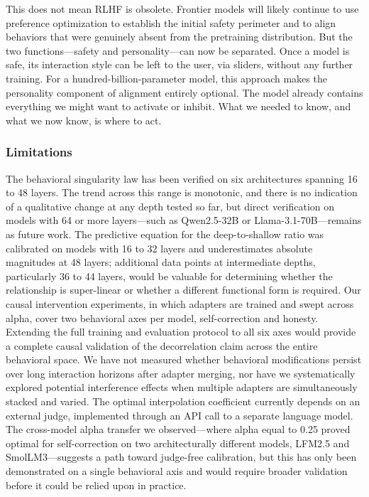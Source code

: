 \documentclass[11pt,a4paper]{article}
\begin{document}
This does not mean RLHF is obsolete. Frontier models will likely continue to use preference optimization to establish the initial safety perimeter and to align behaviors that were genuinely absent from the pretraining distribution. But the two functions---safety and personality---can now be separated. Once a model is safe, its interaction style can be left to the user, via sliders, without any further training. For a hundred-billion-parameter model, this approach makes the personality component of alignment entirely optional. The model already contains everything we might want to activate or inhibit. What we needed to know, and what we now know, is where to act.

\subsubsection{Limitations}

The behavioral singularity law has been verified on six architectures spanning 16 to 48 layers. The trend across this range is monotonic, and there is no indication of a qualitative change at any depth tested so far, but direct verification on models with 64 or more layers---such as Qwen2.5-32B or Llama-3.1-70B---remains as future work. The predictive equation for the deep-to-shallow ratio was calibrated on models with 16 to 32 layers and underestimates absolute magnitudes at 48 layers; additional data points at intermediate depths, particularly 36 to 44 layers, would be valuable for determining whether the relationship is super-linear or whether a different functional form is required. Our causal intervention experiments, in which adapters are trained and swept across alpha, cover two behavioral axes per model, self-correction and honesty. Extending the full training and evaluation protocol to all six axes would provide a complete causal validation of the decorrelation claim across the entire behavioral space. We have not measured whether behavioral modifications persist over long interaction horizons after adapter merging, nor have we systematically explored potential interference effects when multiple adapters are simultaneously stacked and varied. The optimal interpolation coefficient currently depends on an external judge, implemented through an API call to a separate language model. The cross-model alpha transfer we observed---where alpha equal to 0.25 proved optimal for self-correction on two architecturally different models, LFM2.5 and SmolLM3---suggests a path toward judge-free calibration, but this has only been demonstrated on a single behavioral axis and would require broader validation before it could be relied upon in practice.
\end{document}
